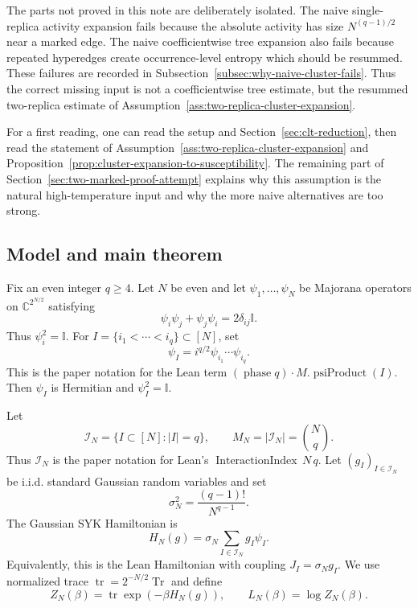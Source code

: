 \documentclass[11pt]{article}
\newcommand{\Tr}{\operatorname{Tr}}
\newcommand{\tr}{\operatorname{tr}}
\newcommand{\I}{\mathbb{I}}
\newcommand{\C}{\mathbb{C}}
\newcommand{\calI}{\mathcal{I}}
\begin{document}
The parts not proved in this note are deliberately isolated.  The naive
single-replica activity expansion fails because the absolute activity has size
$N^{(q-1)/2}$ near a marked edge.  The naive coefficientwise tree expansion also
fails because repeated hyperedges create occurrence-level entropy which should
be resummed.  These failures are recorded in
Subsection~\ref{subsec:why-naive-cluster-fails}.  Thus the correct missing input
is not a coefficientwise tree estimate, but the resummed two-replica estimate of
Assumption~\ref{ass:two-replica-cluster-expansion}.

For a first reading, one can read the setup and
Section~\ref{sec:clt-reduction}, then read the statement of
Assumption~\ref{ass:two-replica-cluster-expansion} and
Proposition~\ref{prop:cluster-expansion-to-susceptibility}.  The remaining part
of Section~\ref{sec:two-marked-proof-attempt} explains why this assumption is
the natural high-temperature input and why the more naive alternatives are too
strong.

\subsection{Model and main theorem}

Fix an even integer $q\geq4$.  Let $N$ be even and let
$\psi_1,\ldots,\psi_N$ be Majorana operators on $\C^{2^{N/2}}$ satisfying
\begin{equation}\label{eq:majorana-relations}
  \psi_i\psi_j+\psi_j\psi_i=2\delta_{ij}\I.
\end{equation}
Thus $\psi_i^2=\I$.  For $I=\{i_1<\cdots<i_q\}\subset[N]$, set
\begin{equation}\label{eq:psiI}
  \psi_I=i^{q/2}\psi_{i_1}\cdots\psi_{i_q}.
\end{equation}
This is the paper notation for the Lean term
$(\operatorname{phase} q)\cdot M.\operatorname{psiProduct}(I)$.  Then
$\psi_I$ is Hermitian and $\psi_I^2=\I$.

Let
\begin{equation}\label{eq:calI-Nn}
  \calI_N=\{I\subset[N]: |I|=q\},
  \qquad
  M_N=|\calI_N|=\binom{N}{q}.
\end{equation}
Thus $\calI_N$ is the paper notation for Lean's
$\operatorname{InteractionIndex}\,N\,q$.
Let $(g_I)_{I\in\calI_N}$ be i.i.d. standard Gaussian random variables and set
\begin{equation}\label{eq:sigma}
  \sigma_N^2=\frac{(q-1)!}{N^{q-1}}.
\end{equation}
The Gaussian SYK Hamiltonian is
\begin{equation}\label{eq:Hn}
  H_N(g)=\sigma_N\sum_{I\in\calI_N}g_I\psi_I.
\end{equation}
Equivalently, this is the Lean Hamiltonian with coupling
$J_I=\sigma_Ng_I$.  We use normalized trace $\tr=2^{-N/2}\Tr$ and define
\begin{equation}\label{eq:Zn-Ln}
  Z_N(\beta)=\tr\exp(-\beta H_N(g)),
  \qquad
  L_N(\beta)=\log Z_N(\beta).
\end{equation}
\end{document}
